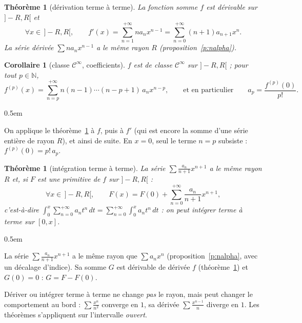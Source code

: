 \documentclass[a4paper,11pt]{article}
\makeatletter
\numberwithin{equation}{section}
\numberwithin{figure}{section}
\numberwithin{table}{section}
\theoremstyle{enonce}
\newtheorem{theoreme}[definition]{Théorème}
\newtheorem{corollaire}[definition]{Corollaire}
\theoremstyle{exemple}
\theoremstyle{remarque}
\renewcommand{\proofname}{Démonstration}
\renewenvironment{proof}[1][\proofname]{\par\pushQED{\qed}\normalfont
  \topsep0.5em\relax\trivlist\item[\hskip\labelsep\sffamily\itshape\color{Gris}#1.]\ignorespaces}
  {\popQED\endtrivlist\@endpefalse}
\newcommand{\N}{\mathbb{N}}
\makeatother
\begin{document}
\begin{theoreme}[dérivation terme à terme]\label{t:derivation}
La fonction somme $f$ est dérivable sur $]-R,R[$ et
\[\forall x\in\,]-R,R[,\qquad f'(x)=\sum_{n=1}^{+\infty}na_nx^{n-1}=\sum_{n=0}^{+\infty}(n+1)a_{n+1}x^n.\]
La série dérivée $\sum na_nx^{n-1}$ a le même rayon $R$ (proposition~\ref{p:nalpha}).
\end{theoreme}

\begin{corollaire}[classe $\mathcal C^\infty$, coefficients]\label{c:cinfini}
$f$ est de classe $\mathcal C^\infty$ sur $]-R,R[$ ; pour tout $p\in\N$,
\[f^{(p)}(x)=\sum_{n=p}^{+\infty}n(n-1)\cdots(n-p+1)\,a_nx^{n-p},\qquad\text{et en particulier}\qquad a_p=\frac{f^{(p)}(0)}{p!}.\]
\end{corollaire}

\begin{proof}
On applique le théorème~\ref{t:derivation} à $f$, puis à $f'$ (qui est encore la somme d'une série entière de rayon $R$), et ainsi
de suite. En $x=0$, seul le terme $n=p$ subsiste : $f^{(p)}(0)=p!\,a_p$.
\end{proof}

\begin{theoreme}[intégration terme à terme]\label{t:integration}
La série $\sum\frac{a_n}{n+1}x^{n+1}$ a le même rayon $R$ et, si $F$ est une primitive de $f$ sur $]-R,R[$ :
\[\forall x\in\,]-R,R[,\qquad F(x)=F(0)+\sum_{n=0}^{+\infty}\frac{a_n}{n+1}x^{n+1},\]
c'est-à-dire $\displaystyle\int_0^x\sum_{n=0}^{+\infty}a_nt^n\,dt=\sum_{n=0}^{+\infty}\int_0^xa_nt^n\,dt$ : on peut intégrer terme à terme sur $[0,x]$.
\end{theoreme}

\begin{proof}
La série $\sum\frac{a_n}{n+1}x^{n+1}$ a le même rayon que $\sum a_nx^n$ (proposition~\ref{p:nalpha}, avec un décalage d'indice). Sa
somme $G$ est dérivable de dérivée $f$ (théorème~\ref{t:derivation}) et $G(0)=0$ : $G=F-F(0)$.
\end{proof}

\begin{attention}
Dériver ou intégrer terme à terme ne change \emph{pas} le rayon, mais peut changer le comportement au bord : $\sum\frac{x^n}{n^2}$
converge en $1$, sa dérivée $\sum\frac{x^{n-1}}n$ diverge en $1$. Les théorèmes s'appliquent sur l'intervalle \emph{ouvert}.
\end{attention}
\end{document}
